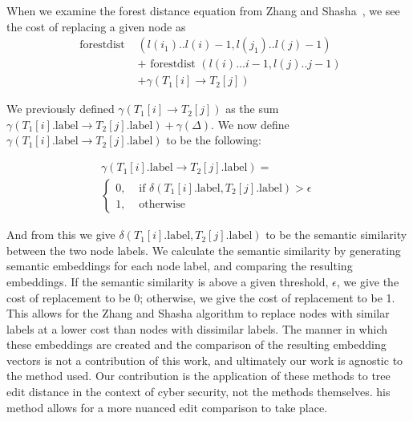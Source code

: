 When we examine the forest distance equation from Zhang and Shasha~\cite{zhang_simple_1989}, we see the cost of replacing a given node as
\begin{align*}
    \text { forestdist } & \left(l\left(i_1\right) . . l(i)-1, l\left(j_1\right) . . l(j)-1\right) \\
                         & + \text { forestdist }(l(i) \ldots i-1, l(j) . . j-1)                   \\
                         & + \gamma\left(T_1[i] \rightarrow T_2[j]\right)
\end{align*}


We previously defined $\gamma\left(T_1[i] \rightarrow T_2[j]\right)$  as the sum $\gamma({T_1[i].\text{label}} \rightarrow {T_2[j].\text{label}}) + \gamma(\Delta)$. We now define $\gamma\left(T_1[i].\text{label} \rightarrow T_2[j].\text{label}\right)$ to be the following:

\begin{multline*}
    \gamma\left(T_1[i].\text{label} \rightarrow T_2[j].\text{label}\right)=\\\left\{\begin{array}{ll}
        0, & \text { if } \delta\left(T_1[i].\text{label}, T_2[j].\text{label}\right)>\epsilon \\
        1, & \text { otherwise }
    \end{array}\right.
\end{multline*}

And from this we give $\delta\left(T_1[i].\text{label}, T_2[j].\text{label}\right)$ to be the semantic similarity between the two node labels. We calculate the semantic similarity by generating semantic embeddings for each node label, and comparing the resulting embeddings. If the semantic similarity is above a given threshold, $\epsilon$, we give the cost of replacement to be 0; otherwise, we give the cost of replacement to be 1. This allows for the Zhang and Shasha algorithm to replace nodes with similar labels at a lower cost than nodes with dissimilar labels. The manner in which these embeddings are created and the comparison of the resulting embedding vectors is not a contribution of this work, and ultimately our work is agnostic to the method used. Our contribution is the application of these methods to tree edit distance in the context of cyber security, not the methods themselves. his method allows for a more nuanced edit comparison to take place. 




